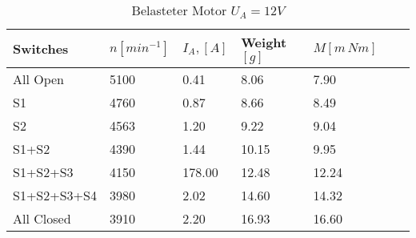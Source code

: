 \begin{table}[htbp]
   \centering
   \begin{tabularx}{\columnwidth}{XXXXXXX}
      \toprule
      Switches    & $n [min^{-1}]$ & $I_A ,[A]$ & Weight $[g]$ & $M [m\,Nm]$ \\
      \midrule
      All Open    & 5100           & 0.41       & 8.06         & 7.90        \\
      S1          & 4760           & 0.87       & 8.66         & 8.49        \\
      S2          & 4563           & 1.20       & 9.22         & 9.04        \\
      S1+S2       & 4390           & 1.44       & 10.15        & 9.95        \\
      S1+S2+S3    & 4150           & 178.00     & 12.48        & 12.24       \\
      S1+S2+S3+S4 & 3980           & 2.02       & 14.60        & 14.32       \\
      All Closed  & 3910           & 2.20       & 16.93        & 16.60       \\
      \bottomrule
   \end{tabularx}
   \caption{Belasteter Motor $U_A=12V$}
\end{table}

